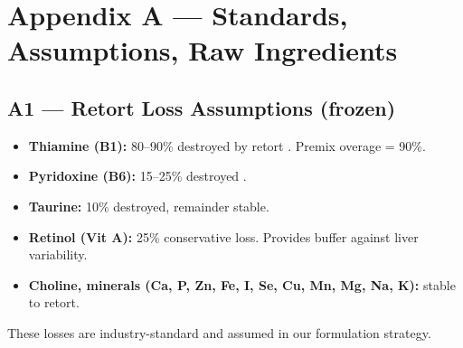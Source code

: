 \section*{Appendix A --- Standards, Assumptions, Raw Ingredients}

\subsection*{A1 --- Retort Loss Assumptions (frozen)}
\begin{itemize}
  \item \textbf{Thiamine (B1):} 80--90\% destroyed by retort \cite{ref3}. Premix overage = 90\%.
  \item \textbf{Pyridoxine (B6):} 15--25\% destroyed \cite{ref3}.
  \item \textbf{Taurine:} 10\% destroyed, remainder stable.
  \item \textbf{Retinol (Vit A):} 25\% conservative loss. Provides buffer against liver variability.
  \item \textbf{Choline, minerals (Ca, P, Zn, Fe, I, Se, Cu, Mn, Mg, Na, K):} stable to retort.
\end{itemize}
\noindent These losses are industry-standard and assumed in our formulation strategy.

